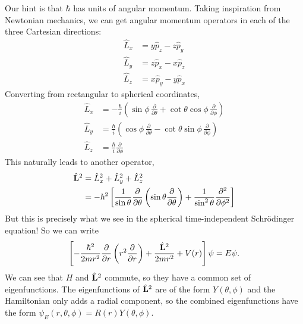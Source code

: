 \documentclass[../p052main.tex]{subfiles}
\begin{document}
Our hint is that $\hbar$ has units of angular momentum.
Taking inspiration from Newtonian mechanics, we can get angular momentum operators in each of the three Cartesian directions:
\begin{align*}
    \hat L_x &= y \hat p_z - z \hat p_y \\
    \hat L_y &= z \hat p_x - x \hat p_z \\
    \hat L_z &= x \hat p_y - y \hat p_x
\end{align*}
Converting from rectangular to spherical coordinates,
\begin{align*}
    \hat L_x &= -\frac{\hbar}{i} \left( \sin \phi \,\frac{\partial}{\partial \theta} + \cot \theta \cos \phi \,\frac{\partial}{\partial \phi} \right) \\
    \hat L_y &= \frac{\hbar}{i} \left( \cos \phi \,\frac{\partial}{\partial \theta} - \cot \theta \sin \phi \,\frac{\partial}{\partial \phi} \right) \\
    \hat L_z &= \frac{\hbar}{i} \frac{\partial}{\partial \phi}
\end{align*}
This naturally leads to another operator,
\begin{align*}
    \hat{\mathbf{L}}^2 &= \hat L_x^2 + \hat L_y^2 + \hat L_z^2 \\
    &= -\hbar^2 \left[ \frac{1}{\sin \theta} \frac{\partial}{\partial \theta} \left( \sin \theta \frac{\partial}{\partial \theta} \right) + \frac{1}{\sin^2 \theta} \frac{\partial^2}{\partial \phi^2} \right]
\end{align*}
But this is precisely what we see in the spherical time-independent Schrödinger equation!
So we can write
\[ \left[ -\frac{\hbar^2}{2mr^2} \frac{\partial}{\partial r} \left( r^2 \frac{\partial}{\partial r} \right) + \frac{\hat{\mathbf{L}}^2}{2mr^2} + V(r) \right] \psi = E\psi. \]
We can see that $H$ and $\hat{\mathbf{L}}^2$ commute, so they have a common set of eigenfunctions.
The eigenfunctions of $\hat{\mathbf{L}}^2$ are of the form $Y(\theta, \phi)$ and the Hamiltonian only adds a radial component, so the combined eigenfunctions have the form $\psi_E (r,\theta,\phi) = R(r) Y(\theta, \phi)$.
\end{document}

